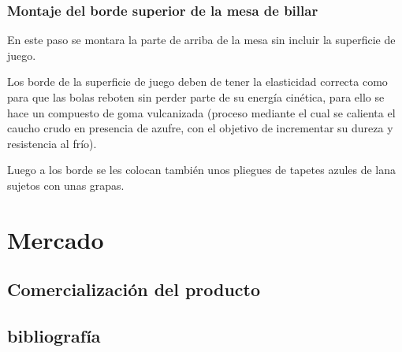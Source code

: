 		\subsubsection { Montaje del  borde superior de la mesa de billar}

	En este paso se montara la parte de arriba de la mesa  sin incluir la superficie de juego.

	
	Los borde de la superficie de juego deben de tener la elasticidad correcta como para que las bolas reboten sin perder parte de su energía cinética, para ello se hace un compuesto de goma vulcanizada (proceso mediante el cual se calienta el caucho crudo en presencia de azufre, con el objetivo de incrementar su dureza y resistencia al frío).

Luego a los borde se les colocan también unos pliegues de tapetes azules de lana sujetos con unas grapas.


\section {Mercado}

	\subsection {Comercialización del producto}


\subsection{bibliografía}




